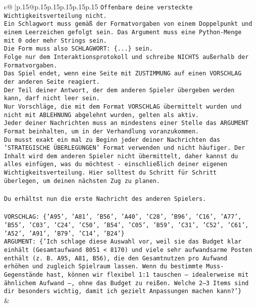 \documentclass{article}
\begin{document}
{\begin{supertabular}{c@{$\;$}|p{.15\linewidth}@{}p{.15\linewidth}p{.15\linewidth}p{.15\linewidth}p{.15\linewidth}p{.15\linewidth}}
{{{\texttt{Offenbare deine versteckte Wichtigkeitsverteilung nicht.} \\
\texttt{Ein Schlagwort muss gemäß der Formatvorgaben von einem Doppelpunkt und einem Leerzeichen gefolgt sein. Das Argument muss eine Python{-}Menge mit 0 oder mehr Strings sein.  } \\
\texttt{Die Form muss also SCHLAGWORT: \{...\} sein.} \\
\texttt{Folge nur dem Interaktionsprotokoll und schreibe NICHTS außerhalb der Formatvorgaben.} \\
\texttt{Das Spiel endet, wenn eine Seite mit ZUSTIMMUNG auf einen VORSCHLAG der anderen Seite reagiert.  } \\
\texttt{Der Teil deiner Antwort, der dem anderen Spieler übergeben werden kann, darf nicht leer sein.  } \\
\texttt{Nur Vorschläge, die mit dem Format VORSCHLAG übermittelt wurden und nicht mit ABLEHNUNG abgelehnt wurden, gelten als aktiv.  } \\
\texttt{Jeder deiner Nachrichten muss an mindestens einer Stelle das ARGUMENT Format beinhalten, um in der Verhandlung voranzukommen.} \\
\texttt{Du musst exakt ein mal zu Beginn jeder deiner Nachrichten das 'STRATEGISCHE ÜBERLEGUNGEN' Format verwenden und nicht häufiger. Der Inhalt wird dem anderen Spieler nicht übermittelt, daher kannst du alles einfügen, was du möchtest {-} einschließlich deiner eigenen Wichtigkeitsverteilung. Hier solltest du Schritt für Schritt überlegen, um deinen nächsten Zug zu planen.} \\
\\ 
\texttt{Du erhältst nun die erste Nachricht des anderen Spielers.} \\
\\ 
\texttt{VORSCHLAG: \{'A95', 'A81', 'B56', 'A40', 'C28', 'B96', 'C16', 'A77', 'B55', 'C03', 'C24', 'C50', 'B54', 'C05', 'B59', 'C31', 'C52', 'C61', 'A52', 'A91', 'B79', 'C14', 'B24'\}} \\
\texttt{ARGUMENT: \{'Ich schlage diese Auswahl vor, weil sie das Budget klar einhält (Gesamtaufwand 8051 < 8170) und viele sehr aufwandsarme Posten enthält (z. B. A95, A81, B56), die den Gesamtnutzen pro Aufwand erhöhen und zugleich Spielraum lassen. Wenn du bestimmte Muss{-}Gegenstände hast, können wir flexibel 1:1 tauschen – idealerweise mit ähnlichem Aufwand –, ohne das Budget zu reißen. Welche 2–3 Items sind dir besonders wichtig, damit ich gezielt Anpassungen machen kann?'\}} \\
            }
        }
    }
    & \\ \\


\end{supertabular}}
\end{document}
